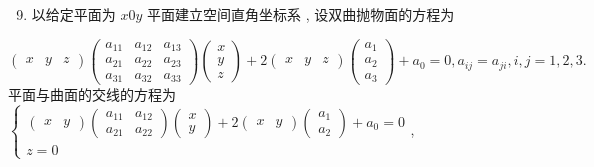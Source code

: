 \documentclass[10pt]{article}
\begin{document}
\begin{enumerate}
  \setcounter{enumi}{8}
  \item  以给定平面为  $x 0 y$  平面建立空间直角坐标系 ,  设双曲抛物面的方程为 
\end{enumerate}
$$
\left(\begin{array}{lll}
x & y & z
\end{array}\right)\left(\begin{array}{lll}
a_{11} & a_{12} & a_{13} \\
a_{21} & a_{22} & a_{23} \\
a_{31} & a_{32} & a_{33}
\end{array}\right)\left(\begin{array}{l}
x \\
y \\
z
\end{array}\right)+2\left(\begin{array}{lll}
x & y & z
\end{array}\right)\left(\begin{array}{l}
a_{1} \\
a_{2} \\
a_{3}
\end{array}\right)+a_{0}=0, a_{i j}=a_{j i}, i, j=1,2,3 .
$$
 平面与曲面的交线的方程为  $\left\{\begin{array}{l}\left(\begin{array}{ll}x & y\end{array}\right)\left(\begin{array}{ll}a_{11} & a_{12} \\ a_{21} & a_{22}\end{array}\right)\left(\begin{array}{l}x \\ y\end{array}\right)+2\left(\begin{array}{ll}x & y\end{array}\right)\left(\begin{array}{l}a_{1} \\ a_{2}\end{array}\right)+a_{0}=0 \\ z=0\end{array}\right.$,
\end{document}
